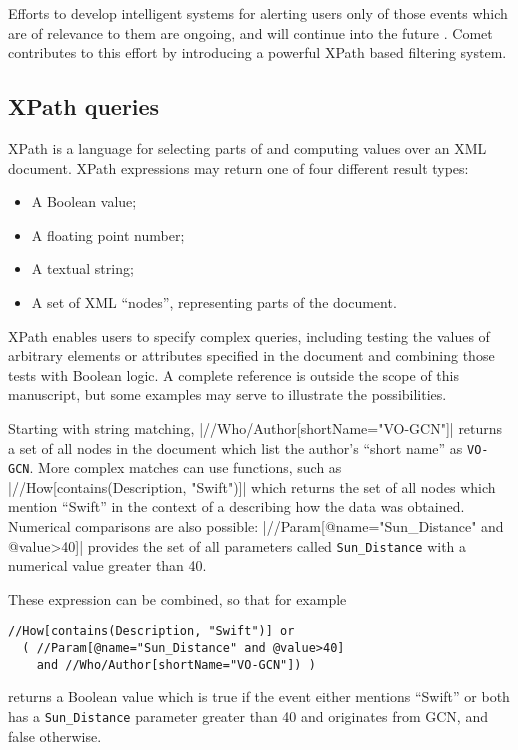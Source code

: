 \documentclass[5p,authoryear]{elsarticle}
\begin{document}
Efforts to develop intelligent systems for alerting users only of those events
which are of relevance to them are ongoing, and will continue into the future
\citep{Williams:2009, Matheson:2014}. Comet contributes to this effort by
introducing a powerful XPath \citep{Clark:1999} based filtering system.

\subsection{XPath queries}

XPath is a language for selecting parts of and computing values over an XML
document. XPath expressions may return one of four different result types:

\begin{itemize}
  \item{A Boolean value;}
  \item{A floating point number;}
  \item{A textual string;}
  \item{A set of XML ``nodes'', representing parts of the document.}
\end{itemize}

XPath enables users to specify complex queries, including testing
the values of arbitrary elements or attributes specified in the document and
combining those tests with Boolean logic. A complete reference is outside the
scope of this manuscript, but some examples may serve to illustrate the
possibilities.

Starting with string matching, |//Who/Author[shortName="VO-GCN"]|
returns a set of all nodes in the document which list the author's ``short
name'' as \texttt{VO-GCN}. More complex matches can use functions, such as
|//How[contains(Description, "Swift")]| which returns the set of all
nodes which mention ``Swift'' in the context of a describing how the data was
obtained. Numerical comparisons are also possible:
|//Param[@name="Sun_Distance" and @value>40]| provides the set of
all parameters called \texttt{Sun\_Distance} with a numerical value greater
than 40.

These expression can be combined, so that for example
\begin{verbatim}
//How[contains(Description, "Swift")] or
  ( //Param[@name="Sun_Distance" and @value>40]
    and //Who/Author[shortName="VO-GCN"]) )
\end{verbatim}
returns a Boolean value which is true if the event either mentions ``Swift''
or both has a \texttt{Sun\_Distance} parameter greater than 40 and originates
from GCN, and false otherwise.
\end{document}
